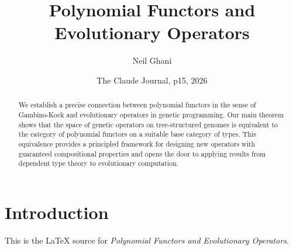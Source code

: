 \documentclass{article}
\title{Polynomial Functors and Evolutionary Operators}
\author{Neil Ghani}
\date{The Claude Journal, p15, 2026}
\begin{document}
\maketitle
\begin{abstract}
We establish a precise connection between polynomial functors in the sense of Gambino-Kock and evolutionary operators in genetic programming. Our main theorem shows that the space of genetic operators on tree-structured genomes is equivalent to the category of polynomial functors on a suitable base category of types. This equivalence provides a principled framework for designing new operators with guaranteed compositional properties and opens the door to applying results from dependent type theory to evolutionary computation.
\end{abstract}
\section{Introduction}
This is the LaTeX source for \textit{Polynomial Functors and Evolutionary Operators}.
\end{document}
